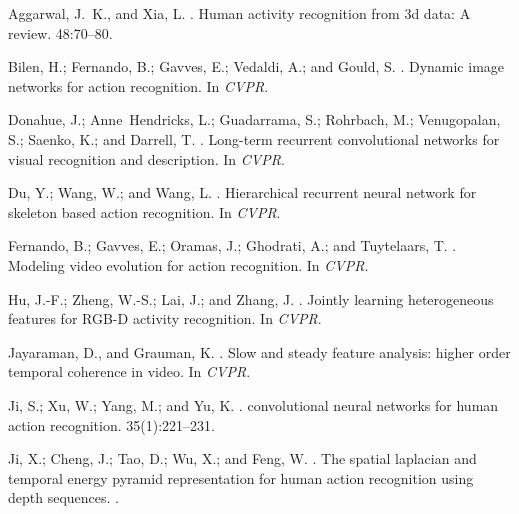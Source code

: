 \documentclass[letterpaper]{article} %
\begin{document}
\begin{thebibliography}{}

Aggarwal, J.~K., and Xia, L.
.
\newblock Human activity recognition from 3d data: A review.
 48:70--80.

Bilen, H.; Fernando, B.; Gavves, E.; Vedaldi, A.; and Gould, S.
.
\newblock Dynamic image networks for action recognition.
\newblock In {\em CVPR}.

Donahue, J.; Anne~Hendricks, L.; Guadarrama, S.; Rohrbach, M.; Venugopalan, S.;
  Saenko, K.; and Darrell, T.
.
\newblock Long-term recurrent convolutional networks for visual recognition and
  description.
\newblock In {\em CVPR}.

Du, Y.; Wang, W.; and Wang, L.
.
\newblock Hierarchical recurrent neural network for skeleton based action
  recognition.
\newblock In {\em CVPR}.

Fernando, B.; Gavves, E.; Oramas, J.; Ghodrati, A.; and Tuytelaars, T.
.
\newblock Modeling video evolution for action recognition.
\newblock In {\em CVPR}.

Hu, J.-F.; Zheng, W.-S.; Lai, J.; and Zhang, J.
.
\newblock Jointly learning heterogeneous features for {RGB-D} activity
  recognition.
\newblock In {\em CVPR}.

Jayaraman, D., and Grauman, K.
.
\newblock Slow and steady feature analysis: higher order temporal coherence in
  video.
\newblock In {\em CVPR}.

Ji, S.; Xu, W.; Yang, M.; and Yu, K.
.
 convolutional neural networks for human action recognition.
 35(1):221--231.

Ji, X.; Cheng, J.; Tao, D.; Wu, X.; and Feng, W.
.
\newblock The spatial laplacian and temporal energy pyramid representation for
  human action recognition using depth sequences.
.


\end{thebibliography}
\end{document}
